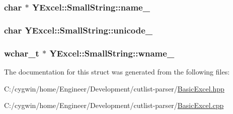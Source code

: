 \subsubsection[{name\+\_\+}]{\setlength{\rightskip}{0pt plus 5cm}char $\ast$ Y\+Excel\+::\+Small\+String\+::name\+\_\+}\label{struct_y_excel_1_1_small_string_ad79801a595a59e606ebb2907edfdff0f}
\hypertarget{struct_y_excel_1_1_small_string_abda19206889e2e70ce37ff05bb226627}{}
\subsubsection[{unicode\+\_\+}]{\setlength{\rightskip}{0pt plus 5cm}char Y\+Excel\+::\+Small\+String\+::unicode\+\_\+}\label{struct_y_excel_1_1_small_string_abda19206889e2e70ce37ff05bb226627}
\hypertarget{struct_y_excel_1_1_small_string_a510cbaee114e4634f138d8a934499f89}{}
\subsubsection[{wname\+\_\+}]{\setlength{\rightskip}{0pt plus 5cm}wchar\+\_\+t $\ast$ Y\+Excel\+::\+Small\+String\+::wname\+\_\+}\label{struct_y_excel_1_1_small_string_a510cbaee114e4634f138d8a934499f89}


The documentation for this struct was generated from the following files\+:\begin{DoxyCompactItemize}
\item 
C\+:/cygwin/home/\+Engineer/\+Development/cutlist-\/parser/\hyperlink{_basic_excel_8hpp}{Basic\+Excel.\+hpp}\item 
C\+:/cygwin/home/\+Engineer/\+Development/cutlist-\/parser/\hyperlink{_basic_excel_8cpp}{Basic\+Excel.\+cpp}\end{DoxyCompactItemize}
